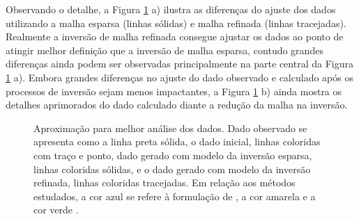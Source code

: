 Observando o detalhe, a Figura \ref{fig:zoom_in} a) ilustra as diferenças do ajuste dos dados utilizando a malha esparsa (linhas sólidas) e malha refinada (linhas tracejadas). Realmente a inversão de malha refinada consegue ajustar os dados ao ponto de atingir melhor definição que a inversão de malha esparsa, contudo grandes diferenças ainda podem ser observadas principalmente na parte central da Figura \ref{fig:zoom_in} a). Embora grandes diferenças no ajuste do dado observado e calculado após os processos de inversão sejam menos impactantes, a Figura \ref{fig:zoom_in} b) ainda mostra os detalhes aprimorados do dado calculado diante a redução da malha na inversão.

\begin{figure}[H]
	\centering
	
	\caption{Aproximação para melhor análise dos dados. Dado observado se apresenta como a linha preta sólida, o dado inicial, linhas coloridas com traço e ponto, dado gerado com modelo da inversão esparsa, linhas coloridas sólidas, e o dado gerado com modelo da inversão refinada, linhas coloridas tracejadas. Em relação aos métodos estudados, a cor azul se refere à formulação de , a cor amarela  e a cor verde .}
	\label{fig:zoom_in}
\end{figure}

